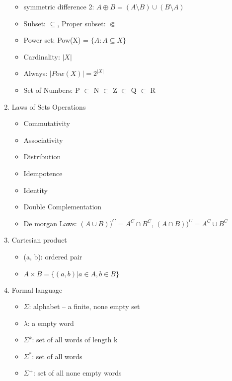 \documentclass[11pt, a4paper]{article}
\begin{document}
\begin{enumerate}
\begin{itemize}
            \item symmetric difference 2: $A \oplus B = (A \setminus B) \cup (B \setminus A)$
            \item Subset: $\subseteq$, Proper subset: $\Subset$
            \item Power set: Pow(X) = $\{A: A \subseteq X\}$
            \item Cardinality: $|X|$
            \item Always: $|Pow(X)| = 2^{|X|}$
            \item Set of Numbers: P $\subset$ N $\subset$ Z $\subset$ Q $\subset$ R
        \end{itemize}
    \item Laws of Sets Operations
        \begin{itemize}
            \item Commutativity
            \item Associativity
            \item Distribution
            \item Idempotence
            \item Identity
            \item Double Complementation
            \item De morgan Laws: $(A \cup B))^C = A^C \cap B^C$, $(A \cap B))^C = A^C \cup B^C$
        \end{itemize}
    \item Cartesian product
        \begin{itemize}
            \item (a, b): ordered pair
            \item $A \times B = \{(a,b) | a \in A, b \in B\}$
        \end{itemize}
    \item Formal language
        \begin{itemize}
            \item $\Sigma$: alphabet -- a finite, none empty set
            \item $\lambda$: a empty word
            \item $\Sigma^k$: set of all words of length k
            \item $\Sigma^*$: set of all words
            \item $\Sigma^+$: set of all none empty words
        \end{itemize}
    \end{enumerate}
\end{document}
